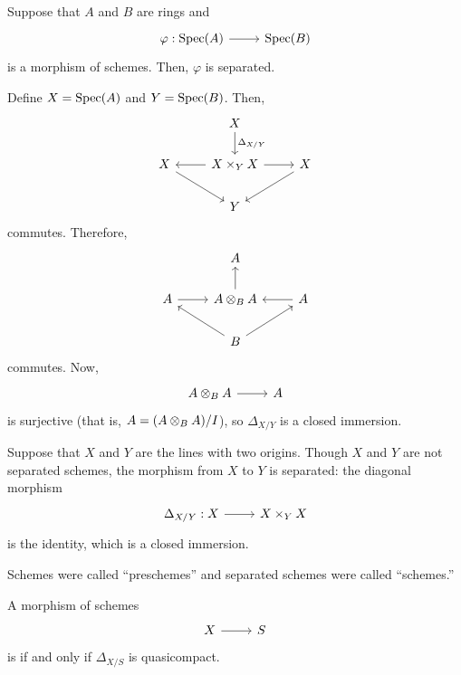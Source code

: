 \documentclass [11 pt, oneside] {article}
\begin{document}
\begin{example}[ ]\label{}\text{}
Suppose that $A$ and $B$ are rings and 
\[
\begin{tikzcd}
\varphi :\Spec(A)\ar[r]& \Spec(B)
\end{tikzcd}
\] 
is a morphism of schemes. Then, $\varphi$ is separated. 

Define $X = \operatorname{Spec} (A)$ and $Y=\operatorname{Spec} (B)$. Then, 
\[
\begin{tikzcd}
	&X\ar[d, "\Delta_{X/Y}"] \\
	X\ar[dr] & X\times_Y X \ar[l]\ar[r] & X\ar[dl]\\
		 &Y
\end{tikzcd}
\]
commutes. Therefore,
\[
\begin{tikzcd}
	&A\\
	A\ar[r]&A\tensor_B A\ar[u] &A\ar[l]\\
	       &B \ar[ur]\ar[ul]
\end{tikzcd}
\]
commutes. Now, 
\[
\begin{tikzcd}
A\tensor_B A\ar[r]& A
\end{tikzcd}
\] 
is surjective (that is, $A = (A\otimes_BA)/I$), so $\Delta_{X/Y}$ is a closed immersion.
\end{example}

\begin{example}[ ]\label{}\text{}
Suppose that $X$ and $Y$ are the lines with two origins. Though $X$ and $Y$ are not separated schemes, the morphism from $X$ to $Y$ is separated: the diagonal morphism  
\[
\begin{tikzcd}
\Delta_{X/Y} :X\ar[r]& X\times_YX
\end{tikzcd}
\] 
is the identity, which is a closed immersion.
\end{example}

\begin{remark}
	Schemes were called ``preschemes'' and separated schemes were called ``schemes.''
\end{remark}

\begin{definition}
	A morphism of schemes
	\[
\begin{tikzcd}
X\ar[r]&S
\end{tikzcd}
\] 
 is  if and only if $\Delta_{X/S}$ is quasicompact.
\end{definition}
\end{document}
